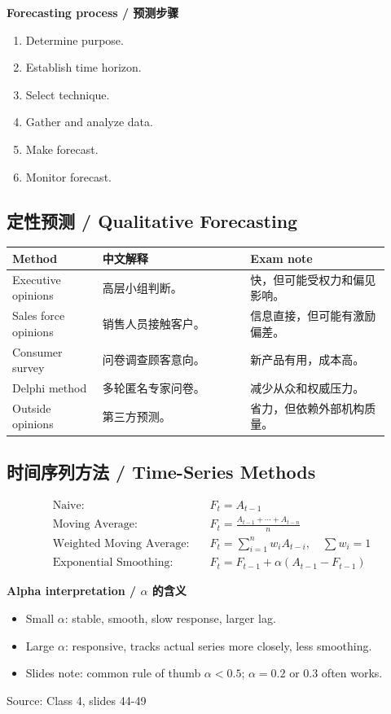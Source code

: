 \documentclass[10pt,a4paper]{ctexart}
\newcommand{\source}[1]{\textcolor{Muted}{\footnotesize Source: #1}}
\begin{document}
\textbf{Forecasting process / 预测步骤}
\begin{enumerate}
  \item Determine purpose.
  \item Establish time horizon.
  \item Select technique.
  \item Gather and analyze data.
  \item Make forecast.
  \item Monitor forecast.
\end{enumerate}

\subsection{定性预测 / Qualitative Forecasting}

\begin{longtable}{@{}L{0.22\linewidth}L{0.36\linewidth}L{0.34\linewidth}@{}}
\toprule
\textbf{Method} & \textbf{中文解释} & \textbf{Exam note} \\
\midrule
Executive opinions & 高层小组判断。 & 快，但可能受权力和偏见影响。 \\
Sales force opinions & 销售人员接触客户。 & 信息直接，但可能有激励偏差。 \\
Consumer survey & 问卷调查顾客意向。 & 新产品有用，成本高。 \\
Delphi method & 多轮匿名专家问卷。 & 减少从众和权威压力。 \\
Outside opinions & 第三方预测。 & 省力，但依赖外部机构质量。 \\
\bottomrule
\end{longtable}

\subsection{时间序列方法 / Time-Series Methods}

\begin{align*}
\text{Naive:}\quad & F_t=A_{t-1}\\
\text{Moving Average:}\quad & F_t=\frac{A_{t-1}+\cdots +A_{t-n}}{n}\\
\text{Weighted Moving Average:}\quad & F_t=\sum_{i=1}^{n}w_iA_{t-i}, \quad \sum w_i=1\\
\text{Exponential Smoothing:}\quad & F_t=F_{t-1}+\alpha(A_{t-1}-F_{t-1})
\end{align*}

\textbf{Alpha interpretation / $\alpha$ 的含义}
\begin{itemize}
  \item Small $\alpha$: stable, smooth, slow response, larger lag.
  \item Large $\alpha$: responsive, tracks actual series more closely, less smoothing.
  \item Slides note: common rule of thumb $\alpha <0.5$; $\alpha=0.2$ or $0.3$ often works.
\end{itemize}
\source{Class 4, slides 44-49}
\end{document}
